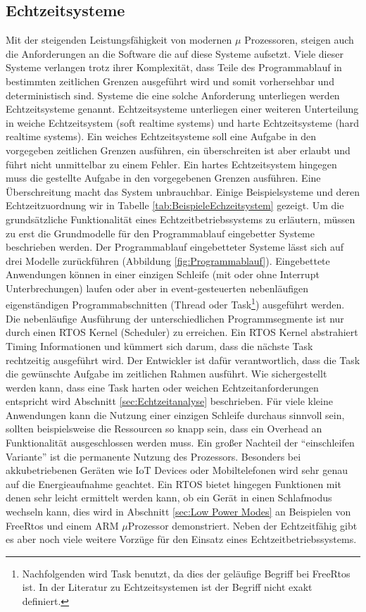 \documentclass[ngerman]{seminarvorlage}
\begin{document}
\subsection{Echtzeitsysteme}
Mit der steigenden Leistungsfähigkeit von modernen $\mu$ Prozessoren, steigen auch die Anforderungen an die Software die auf diese Systeme aufsetzt. Viele dieser Systeme verlangen trotz ihrer Komplexität, dass Teile des Programmablauf in bestimmten zeitlichen Grenzen ausgeführt wird und somit vorhersehbar und deterministisch sind. Systeme die eine solche Anforderung unterliegen werden Echtzeitsysteme genannt. Echtzeitsysteme unterliegen einer weiteren Unterteilung in weiche Echtzeitsystem (soft realtime systems) und harte Echtzeitsysteme (hard realtime systems). Ein weiches Echtzeitsysteme soll eine Aufgabe in den vorgegeben zeitlichen Grenzen ausführen, ein über\-schreiten ist aber erlaubt und führt nicht unmittelbar zu einem Fehler. Ein hartes Echtzeitsystem hingegen muss die gestellte Aufgabe in den vorgegebenen Grenzen ausführen. Eine Überschreitung macht das System unbrauchbar. Einige Beispielsysteme und deren Echtzeitzuordnung wir in Tabelle \ref{tab:BeispieleEchzeitsystem} gezeigt. Um die grundsätzliche Funktionalität eines Echtzeitbetriebssystems zu erläutern, müssen zu erst die Grundmodelle für den Programmablauf eingebetter Systeme beschrieben werden. Der Programmablauf eingebetteter Systeme lässt sich auf drei Modelle zurückführen (Abbildung \ref{fig:Programmablauf}). Eingebettete Anwendungen können in einer einzigen Schleife (mit oder ohne Interrupt Unterbrechungen) laufen oder aber in event-gesteuerten nebenläufigen eigenständigen Programmabschnitten (Thread oder Task\footnote{Nachfolgenden wird Task benutzt, da dies der geläufige Begriff bei FreeRtos ist. In der Literatur zu Echtzeitsystemen ist der Begriff nicht exakt definiert.}) ausgeführt werden. Die nebenläufige Ausführung der unterschiedlichen Programmsegmente ist nur durch einen RTOS Kernel (Scheduler) zu erreichen. Ein RTOS Kernel abstrahiert Timing Informationen und kümmert sich darum, dass die nächste Task rechtzeitig ausgeführt wird. Der Entwickler ist dafür verantwortlich, dass die Task die gewünschte Aufgabe im zeitlichen Rahmen ausführt. Wie sichergestellt werden kann, dass eine Task  harten oder weichen Echtzeitanforderungen entspricht wird Abschnitt \ref{sec:Echtzeitanalyse} beschrieben. Für viele kleine Anwendungen kann die Nutzung einer einzigen Schleife durchaus sinnvoll sein, sollten beispielsweise die Ressourcen so knapp sein, dass ein Overhead an Funktionalität ausgeschlossen werden muss. Ein großer Nachteil der "`einschleifen Variante"' ist die permanente Nutzung des Prozessors. Besonders bei akkubetriebenen Geräten wie IoT Devices oder Mobiltelefonen wird sehr genau auf die Energieaufnahme geachtet. Ein RTOS bietet hingegen Funktionen mit denen sehr leicht ermittelt werden kann, ob ein Gerät in einen Schlafmodus wechseln kann, dies wird in Abschnitt \ref{sec:Low Power Modes} an Beispielen von FreeRtos und einem ARM $\mu$Prozessor demonstriert. Neben der Echtzeitfähig gibt es aber noch viele weitere Vorzüge für den Einsatz eines Echtzeitbetriebssystems.  
\end{document}
